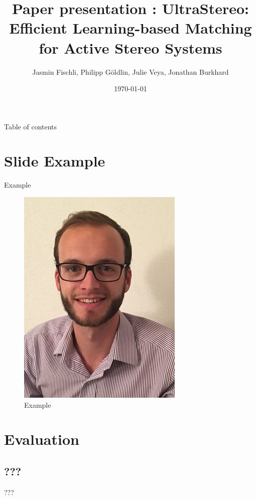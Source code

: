 \documentclass{beamer}
\author{Jasmin Fischli, Philipp Göldlin, Julie Veya, Jonathan Burkhard}
\title{Paper presentation : UltraStereo: Efficient Learning-based Matching for Active Stereo Systems}
\date{\today}
\begin{document}
\frame{\maketitle}
\begin{frame}{Table of contents}{}
	\tableofcontents
\end{frame}

\section{Slide Example}
\begin{frame}{Example}

\begin{figure}
\includegraphics[scale=0.25]{pictures/polop}

\caption{Example}
\end{figure}
\end{frame}
\section{Evaluation}
\subsection{???}
\begin{frame}{???}
\end{frame}
\end{document}
